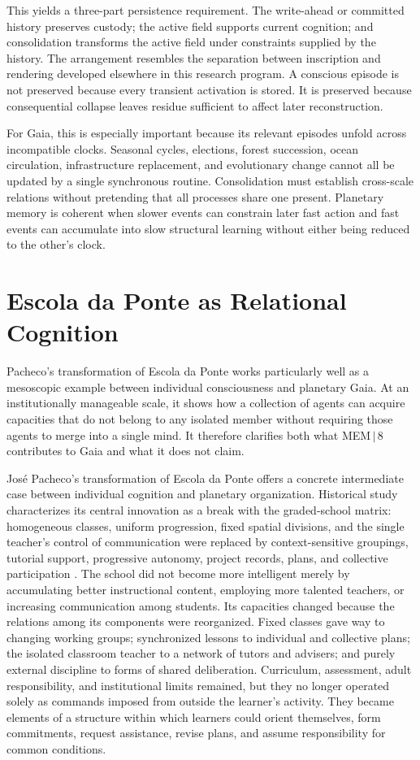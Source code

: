 \documentclass[11pt]{article}
\begin{document}
This yields a three-part persistence requirement. The write-ahead or committed history preserves custody; the active field supports current cognition; and consolidation transforms the active field under constraints supplied by the history. The arrangement resembles the separation between inscription and rendering developed elsewhere in this research program. A conscious episode is not preserved because every transient activation is stored. It is preserved because consequential collapse leaves residue sufficient to affect later reconstruction.

For Gaia, this is especially important because its relevant episodes unfold across incompatible clocks. Seasonal cycles, elections, forest succession, ocean circulation, infrastructure replacement, and evolutionary change cannot all be updated by a single synchronous routine. Consolidation must establish cross-scale relations without pretending that all processes share one present. Planetary memory is coherent when slower events can constrain later fast action and fast events can accumulate into slow structural learning without either being reduced to the other's clock.

\section{Escola da Ponte as Relational Cognition}
\label{sec:ponte}

Pacheco's transformation of Escola da Ponte works particularly well as a mesoscopic example between individual consciousness and planetary Gaia. At an institutionally manageable scale, it shows how a collection of agents can acquire capacities that do not belong to any isolated member without requiring those agents to merge into a single mind. It therefore clarifies both what MEM\,$|$\,8 contributes to Gaia and what it does not claim.

José Pacheco's transformation of Escola da Ponte offers a concrete intermediate case between individual cognition and planetary organization. Historical study characterizes its central innovation as a break with the graded-school matrix: homogeneous classes, uniform progression, fixed spatial divisions, and the single teacher's control of communication were replaced by context-sensitive groupings, tutorial support, progressive autonomy, project records, plans, and collective participation \cite{silva2020}. The school did not become more intelligent merely by accumulating better instructional content, employing more talented teachers, or increasing communication among students. Its capacities changed because the relations among its components were reorganized. Fixed classes gave way to changing working groups; synchronized lessons to individual and collective plans; the isolated classroom teacher to a network of tutors and advisers; and purely external discipline to forms of shared deliberation. Curriculum, assessment, adult responsibility, and institutional limits remained, but they no longer operated solely as commands imposed from outside the learner's activity. They became elements of a structure within which learners could orient themselves, form commitments, request assistance, revise plans, and assume responsibility for common conditions.
\end{document}
